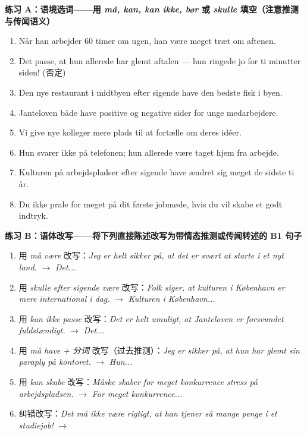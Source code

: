 
\textbf{练习 A：语境选词——用 \textit{må, kan, kan ikke, bør} 或 \textit{skulle} 填空（注意推测与传闻语义）}
\begin{enumerate}
  \item Når han arbejder 60 timer om ugen, \underline{\hspace{1.8cm}} han være meget træt om aftenen.
  \item Det \underline{\hspace{2.2cm}} passe, at hun allerede har glemt aftalen --- hun ringede jo for ti minutter siden! (否定)
  \item Den nye restaurant i midtbyen \underline{\hspace{2.0cm}} efter sigende have den bedste fisk i byen.
  \item Janteloven \underline{\hspace{1.8cm}} både have positive og negative sider for unge medarbejdere.
  \item Vi \underline{\hspace{1.8cm}} give nye kolleger mere plads til at fortælle om deres idéer.
  \item Hun svarer ikke på telefonen; hun \underline{\hspace{1.8cm}} allerede være taget hjem fra arbejde.
  \item Kulturen på arbejdspladser \underline{\hspace{2.0cm}} efter sigende have ændret sig meget de sidste ti år.
  \item Du \underline{\hspace{1.8cm}} ikke prale for meget på dit første jobmøde, hvis du vil skabe et godt indtryk.
\end{enumerate}

\textbf{练习 B：语体改写——将下列直接陈述改写为带情态推测或传闻转述的 B1 句子}
\begin{enumerate}
  \item 用 \textit{må være} 改写：\textit{Jeg er helt sikker på, at det er svært at starte i et nyt land.} $\rightarrow$ \textit{Det...}
  \item 用 \textit{skulle efter sigende være} 改写：\textit{Folk siger, at kulturen i København er mere international i dag.} $\rightarrow$ \textit{Kulturen i København...}
  \item 用 \textit{kan ikke passe} 改写：\textit{Det er helt umuligt, at Janteloven er forsvundet fuldstændigt.} $\rightarrow$ \textit{Det...}
  \item 用 \textit{må have + 分词} 改写（过去推测）：\textit{Jeg er sikker på, at hun har glemt sin paraply på kontoret.} $\rightarrow$ \textit{Hun...}
  \item 用 \textit{kan skabe} 改写：\textit{Måske skaber for meget konkurrence stress på arbejdspladsen.} $\rightarrow$ \textit{For meget konkurrence...}
  \item 纠错改写：\textit{Det må ikke være rigtigt, at han tjener så mange penge i et studiejob!} $\rightarrow$
\end{enumerate}

